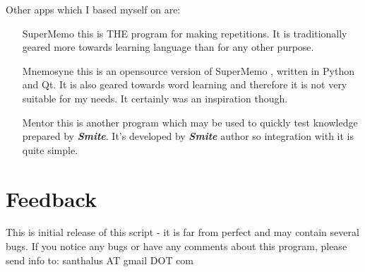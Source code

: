 \documentclass[a4paper,11pt]{article}
\newcommand{\smite}{\emph{\textbf{Smite{}}}}
\begin{document}
Other apps which I based myself on are:
\begin{enumerate}

\item[SuperMemo] this is THE program for making repetitions. It is
  traditionally geared more towards learning language than for any other
  purpose.

\item[Mnemosyne]this is an opensource version of SuperMemo , written in
Python and Qt. It is also geared towards word learning and therefore it
is not very suitable for my needs. It certainly was an inspiration
though.

\item[Mentor] this is another program which may be used to quickly test knowledge prepared by \smite{}.
It's developed by \smite{} author so integration with it is quite simple.

\end{enumerate}

\section{Feedback}
This is initial release of this script - it is far from perfect and may
contain several bugs.
If you notice any bugs or have any comments about this program, please
send info to: santhalus AT gmail DOT com






















































\end{document}
